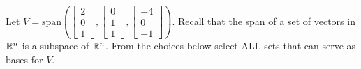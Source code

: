 \documentclass{ximera}
\author{Anna Davis}
\begin{document}
\begin{exercise}
Let $V=\text{span}\left(\begin{bmatrix}2\\0\\1\end{bmatrix},\begin{bmatrix}0\\1\\1\end{bmatrix}, \begin{bmatrix}-4\\0\\-1\end{bmatrix}\right)$.
Recall that the span of a set of vectors in $\mathbb{R}^n$ is a subspace of $\mathbb{R}^n$.  From the choices below select ALL sets that can serve as bases for $V$.

\begin{selectAll}
  \end{selectAll}
\end{exercise}
\end{document}
